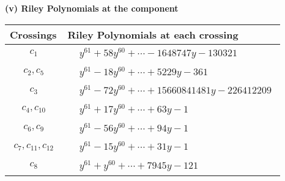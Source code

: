 \documentclass[1p]{elsarticle_modified}
\theoremstyle{definition}
\begin{document}
\flushleft \textbf{(v) Riley Polynomials at the component}\newline \\
\begin{tabular}{m{50pt}|m{274pt}}
Crossings & \hspace{64pt}Riley Polynomials at each crossing \\
\hline $$\begin{aligned}c_{1}\end{aligned}$$&$\begin{aligned}
&y^{61}+58 y^{60}+\cdots-1648747 y-130321
\end{aligned}$\\
\hline $$\begin{aligned}c_{2},c_{5}\end{aligned}$$&$\begin{aligned}
&y^{61}-18 y^{60}+\cdots+5229 y-361
\end{aligned}$\\
\hline $$\begin{aligned}c_{3}\end{aligned}$$&$\begin{aligned}
&y^{61}-72 y^{60}+\cdots+15660841481 y-226412209
\end{aligned}$\\
\hline $$\begin{aligned}c_{4},c_{10}\end{aligned}$$&$\begin{aligned}
&y^{61}+17 y^{60}+\cdots+63 y-1
\end{aligned}$\\
\hline $$\begin{aligned}c_{6},c_{9}\end{aligned}$$&$\begin{aligned}
&y^{61}-56 y^{60}+\cdots+94 y-1
\end{aligned}$\\
\hline $$\begin{aligned}c_{7},c_{11},c_{12}\end{aligned}$$&$\begin{aligned}
&y^{61}-15 y^{60}+\cdots+31 y-1
\end{aligned}$\\
\hline $$\begin{aligned}c_{8}\end{aligned}$$&$\begin{aligned}
&y^{61}+y^{60}+\cdots+7945 y-121
\end{aligned}$\\
\hline
\end{tabular}\\~\\
\end{document}
